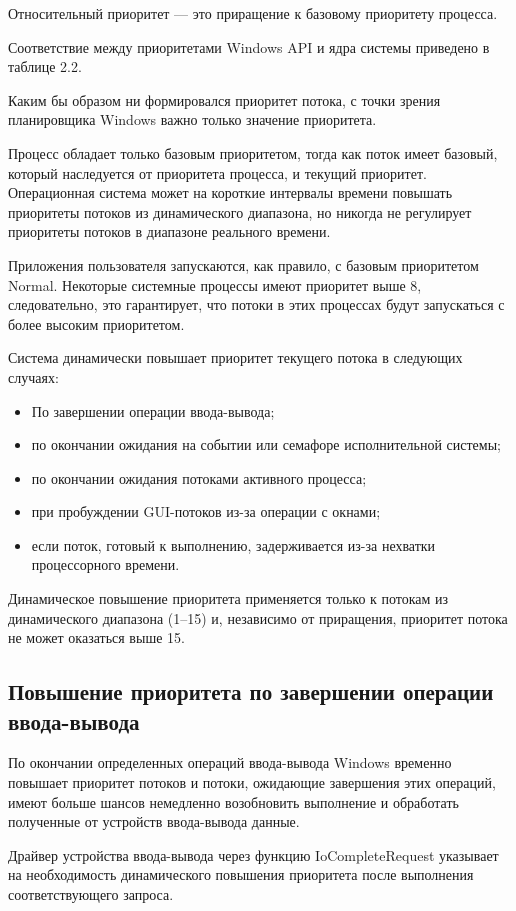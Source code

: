 \documentclass[12pt]{report}
\begin{document}
Относительный приоритет — это приращение к базовому приоритету процесса.

Соответствие между приоритетами Windows API и ядра системы приведено в таблице 2.2.

Каким бы образом ни формировался приоритет потока, с точки зрения планировщика Windows важно только значение приоритета.

Процесс обладает только базовым приоритетом, тогда как поток имеет базовый, который наследуется от приоритета процесса, и текущий приоритет. Операционная система может на короткие
интервалы времени повышать приоритеты потоков из динамического диапазона, но никогда не регулирует приоритеты потоков в диапазоне реального времени.

Приложения пользователя запускаются, как правило, с базовым приоритетом Normal. Некоторые системные процессы имеют приоритет выше 8, следовательно, это гарантирует, что потоки в этих процессах будут запускаться с более высоким приоритетом.

Система динамически повышает приоритет текущего потока в следующих случаях:
\begin{itemize}
	\item По завершении операции ввода-вывода;
	\item по окончании ожидания на событии или семафоре исполнительной системы;
	\item по окончании ожидания потоками активного процесса;
	\item при пробуждении GUI-потоков из-за операции с окнами;
	\item если поток, готовый к выполнению, задерживается из-за нехватки процессорного времени.
\end{itemize}

Динамическое повышение приоритета применяется только к потокам из динамического диапазона (1–15) и, независимо от приращения, приоритет потока не может оказаться выше 15.

\subsection{Повышение приоритета по завершении операции ввода-вывода}

По окончании определенных операций ввода-вывода Windows временно повышает приоритет потоков и потоки,
ожидающие завершения этих операций, имеют больше шансов немедленно возобновить выполнение и обработать полученные от устройств ввода-вывода данные.

Драйвер устройства ввода-вывода через функцию IoCompleteRequest указывает на необходимость динамического повышения приоритета после выполнения соответствующего запроса.
\end{document}
